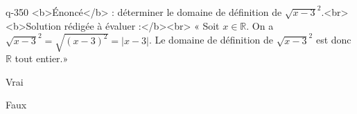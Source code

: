 \begin{truefalse}{q-350}
<b>Énoncé</b> : déterminer le domaine de définition de $\sqrt{x-3}^2$.<br> <b>Solution rédigée à évaluer :</b><br>  « Soit $x\in\mathbb{R}$. On a $\sqrt{x-3}^2 = \sqrt{(x-3)^2} = |x-3|$. Le domaine de définition de $\sqrt{x-3}^2$ est donc $\mathbb{R}$ tout entier.»
\item Vrai
\item* Faux
\end{truefalse}

